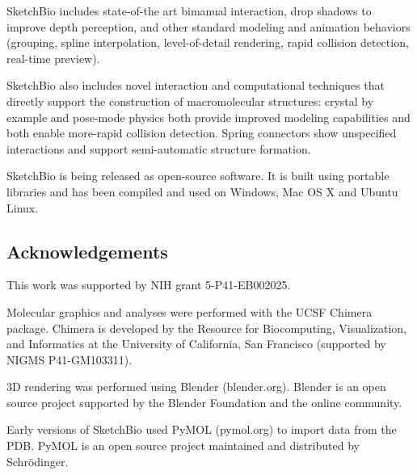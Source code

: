 \documentclass[twocolumn]{bmcart}%
\begin{document}
SketchBio includes state-of-the art bimanual interaction, drop shadows to improve depth perception, and other standard modeling and animation behaviors (grouping, spline interpolation, level-of-detail rendering, rapid collision detection, real-time preview).

SketchBio also includes novel interaction and computational techniques that directly support the construction of macromolecular structures: crystal by example and pose-mode physics both provide improved modeling capabilities and both enable more-rapid collision detection.
Spring connectors show unspecified interactions and support semi-automatic structure formation.

SketchBio is being released as open-source software.
It is built using portable libraries and has been compiled and used on Windows, Mac OS X and Ubuntu Linux.

\subsection*{Acknowledgements}
This work was supported by NIH grant 5-P41-EB002025.

Molecular graphics and analyses were performed with the UCSF Chimera package.
Chimera is developed by the Resource for Biocomputing, Visualization, and Informatics at the University of California, San Francisco (supported by NIGMS P41-GM103311).

3D rendering was performed using Blender (blender.org).
Blender is an open source project supported by the Blender Foundation and the online community.

Early versions of SketchBio used PyMOL (pymol.org) to import data from the PDB.
PyMOL is an open source project maintained and distributed by Schrödinger.

\end{document}
